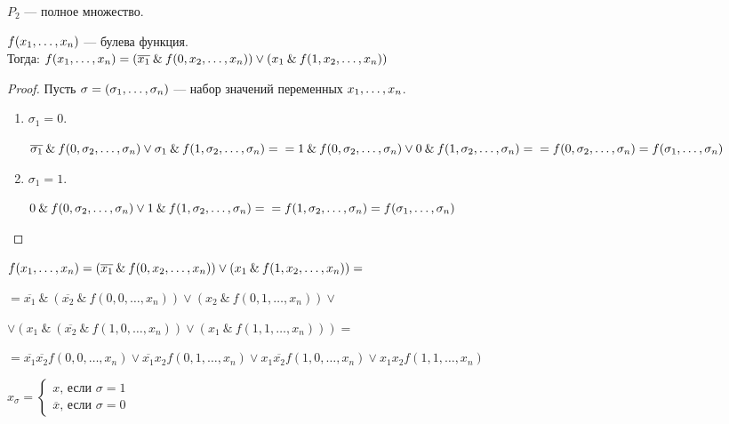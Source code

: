 \begin{example}
	$P_2$ --- полное множество.
\end{example}

\begin{statement}
	$f(x_1, \ldots, x_n)$ --- булева функция. \\Тогда: $f(x_1, \ldots, x_n) = (\overline{x_1} \: \& \: f(0, x_2, \ldots, x_n)) \vee (x_1 \: \& \: f(1, x_2, \ldots , x_n))$
\end{statement}
\begin{proof}
	Пусть $\sigma = (\sigma_1, \ldots, \sigma_n) $ --- набор значений переменных $x_1, \ldots, x_n$.
\begin{enumerate}
\item $\sigma_1 = 0$. 

$\overline{\sigma_1} \: \& \: f(0, \sigma_2, \ldots, \sigma_n) \vee \sigma_1 \: \& \: f(1, \sigma_2, \ldots, \sigma_n) =\\ = 1 \: \& \: f(0, \sigma_2, \ldots, \sigma_n) \vee 0 \: \& \: f(1, \sigma_2, \ldots, \sigma_n) =\\ = f(0, \sigma_2, \ldots, \sigma_n) = f(\sigma_1, \ldots, \sigma_n) $

\item $\sigma_1 = 1$.

$0 \: \& \: f(0, \sigma_2, \ldots, \sigma_n) \vee 1 \: \& \: f(1, \sigma_2, \ldots, \sigma_n) =\\ = f(1, \sigma_2, \ldots, \sigma_n) = f(\sigma_1, \ldots, \sigma_n) $
\end{enumerate}
\end{proof}

$
f(x_1, \ldots, x_n) = (\overline{x_1} \: \& \: f(0, x_2, \ldots, x_n)) \vee (x_1 \: \& \: f(1, x_2, \ldots , x_n)) = $

$= \overline{x_1} \: \& \: (\overline{x_2} \: \& \: f(0, 0, \ldots, x_n)) \vee (x_2 \: \& \: f(0, 1, \ldots , x_n)) \vee $

$ \vee (x_1 \: \& \: (\overline{x_2} \: \& \: f(1, 0, \ldots, x_n)) \vee (x_1 \: \& \: f(1, 1, \ldots , x_n))) =$

$
= \overline{x_1}\overline{x_2}f(0, 0, \ldots, x_n) \vee \overline{x_1} x_2 f(0, 1, \ldots, x_n) \vee x_1 \overline{x_2}f(1, 0, \ldots, x_n) \vee x_1 x_2 f(1, 1, \ldots, x_n)
$

\begin{definition}
	$x_\sigma = \begin{cases} x \text{, если }\sigma = 1 \\ \overline{x} \text{, если }\sigma = 0 \end{cases}$
\end{definition}


